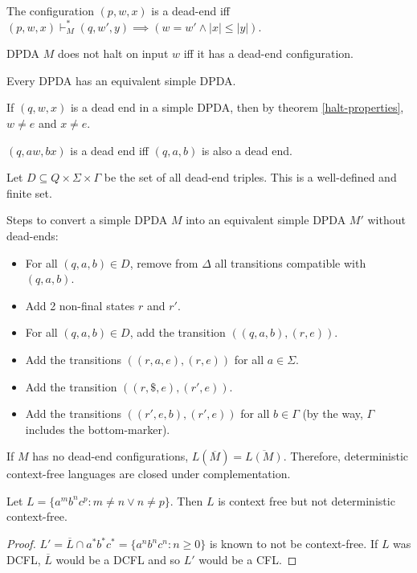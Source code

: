 \begin{definition}
The configuration $(p, w, x)$ is a dead-end iff
$(p, w, x) \vdash_M^* (q, w', y) \implies (w = w' \wedge |x| \le |y|)$.
\end{definition}

\begin{theorem}
DPDA $M$ does not halt on input $w$ iff it has a dead-end configuration.
\end{theorem}

\begin{theorem}
Every DPDA has an equivalent simple DPDA.
\end{theorem}

If $(q, w, x)$ is a dead end in a simple DPDA, then by theorem \ref{halt-properties},
$w \neq e$ and $x \neq e$.
\begin{theorem}
$(q, aw, bx)$ is a dead end iff $(q, a, b)$ is also a dead end.
\end{theorem}

Let $D \subseteq Q \times \Sigma \times \Gamma$ be the set of all dead-end triples.
This is a well-defined and finite set.

Steps to convert a simple DPDA $M$ into an equivalent simple DPDA $M'$ without dead-ends:
\begin{itemize}
\item For all $(q, a, b) \in D$, remove from $\Delta$ all transitions compatible with $(q, a, b)$.
\item Add 2 non-final states $r$ and $r'$.
\item For all $(q, a, b) \in D$, add the transition $((q, a, b), (r, e))$.
\item Add the transitions $((r, a, e), (r, e))$ for all $a \in \Sigma$.
\item Add the transition $((r, \$, e), (r', e))$.
\item Add the transitions $((r', e, b), (r', e))$ for all $b \in \Gamma$
    (by the way, $\Gamma$ includes the bottom-marker).
\end{itemize}

If $M$ has no dead-end configurations, $L(\overline{M}) = \overline{L(M)}$.
Therefore, deterministic context-free languages are closed under complementation.

\begin{theorem}
Let $L = \{a^mb^nc^p: m \neq n \vee n \neq p\}$. Then $L$ is context free but not deterministic context-free.
\end{theorem}
\begin{proof}
$L' = \overline{L}\cap a^*b^*c^* = \{a^nb^nc^n: n \ge 0\}$ is known to not be context-free.
If $L$ was DCFL, $\overline{L}$ would be a DCFL and so $L'$ would be a CFL.
\end{proof}

